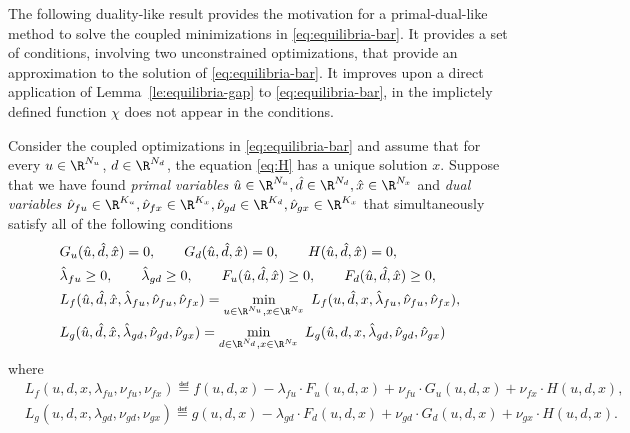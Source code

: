 \documentclass[11pt]{article}
\begin{document}
The following duality-like result provides the motivation for a
primal-dual-like method to solve the coupled minimizations in
\eqref{eq:equilibria-bar}. It provides a set of conditions, involving
two unconstrained optimizations, that provide an approximation to the
solution of \eqref{eq:equilibria-bar}. It improves upon a direct
application of Lemma~\ref{le:equilibria-gap} to
\eqref{eq:equilibria-bar}, in the implictely defined function $\chi$ does
not appear in the conditions.



\begin{corollary}\label{co:equilibria-gap}
  Consider the coupled optimizations in \eqref{eq:equilibria-bar} and
  assume that for every $u\in\R^{N_u}$, $d\in\R^{N_d}$, the equation
  \eqref{eq:H} has a unique solution $x$.  Suppose that we have found
  \emph{primal variables} $\hat u\in\R^{N_u},\hat d\in\R^{N_d},\hat
  x\in\R^{N_x}$ and \emph{dual variables}
  $\hat\nu_{fu}\in\R^{K_u},\hat\nu_{fx}\in\R^{K_x},\hat\nu_{gd}\in\R^{K_d},\hat\nu_{gx}\in\R^{K_x}$
  that simultaneously satisfy all of the following conditions
  \begin{subequations}
    \begin{align}
      \label{eq:equality-constraints-ud-latent}
      &G_u(\hat u,\hat d,\hat x)=0, \qquad
      G_d(\hat u,\hat d,\hat x)=0, \qquad H(\hat u,\hat d,\hat x)=0, \\
      \label{eq:inequality-constraints-ud-latent}
      &\hat\lambda_{fu}\ge0, \qquad \hat\lambda_{gd} \ge 0, \qquad F_u(\hat u,\hat d,\hat x)\ge0,
      \qquad F_d(\hat u,\hat d,\hat x)\ge0,\\
      \label{eq:central-points-ud-latent-1}
      &L_f(\hat u,\hat d,\hat x,\hat\lambda_{fu},\hat\nu_{fu},\hat\nu_{fx})
      =\min_{u\in\R^{N_u},x\in\R^{N_x}}\; L_f(u,\hat d,x,\hat \lambda_{fu},\hat \nu_{fu},\hat\nu_{fx}), \\
      \label{eq:central-points-ud-latent-2}
      &L_g(\hat u,\hat d,\hat x,\hat\lambda_{gd},\hat\nu_{gd},\hat\nu_{gx})
      =\min_{d\in\R^{N_d},x\in\R^{N_x}}\; L_g(\hat u,d,x,\hat \lambda_{gd},\hat \nu_{gd},\hat\nu_{gx})
    \end{align}
  \end{subequations}
  where 
  \begin{align*}
    &L_f(u,d,x,\lambda_{fu},\nu_{fu},\nu_{fx})\eqdef f(u,d,x)-\lambda_{fu}\cdot F_u(u,d,x)+\nu_{fu}\cdot G_u(u,d,x)+\nu_{fx}\cdot H(u,d,x), \\
    &L_g(u,d,x,\lambda_{gd},\nu_{gd},\nu_{gx})\eqdef g(u,d,x)-\lambda_{gd}\cdot F_d(u,d,x)+\nu_{gd}\cdot G_d(u,d,x)+\nu_{gx}\cdot H(u,d,x).

\end{align*}
\end{corollary}
\end{document}
